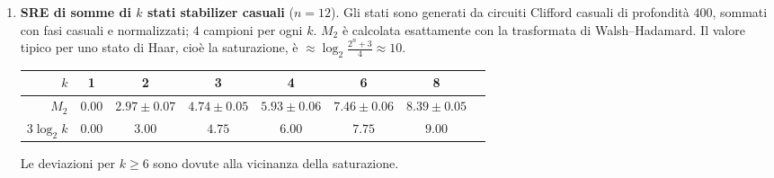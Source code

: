 \begin{enumerate}[leftmargin=1.5em]
\item \textbf{SRE di somme di $k$ stati stabilizer casuali} ($n=12$). Gli stati sono generati da circuiti Clifford casuali di profondità $400$, sommati con fasi casuali e normalizzati; $4$ campioni per ogni $k$. $M_2$ è calcolata esattamente con la trasformata di Walsh--Hadamard. Il valore tipico per uno stato di Haar, cioè la saturazione, è $\approx\log_2\frac{2^n+3}{4}\approx10$.
\begin{center}
\begin{tabular}{@{}rccccccc@{}}
\toprule
$k$ & 1 & 2 & 3 & 4 & 6 & 8\\
\midrule
$M_2$ & $0.00$ & $2.97\pm0.07$ & $4.74\pm0.05$ & $5.93\pm0.06$ & $7.46\pm0.06$ & $8.39\pm0.05$\\
$3\log_2k$ & $0.00$ & $3.00$ & $4.75$ & $6.00$ & $7.75$ & $9.00$\\
\bottomrule
\end{tabular}
\end{center}
Le deviazioni per $k\ge6$ sono dovute alla vicinanza della saturazione.
\end{enumerate}
